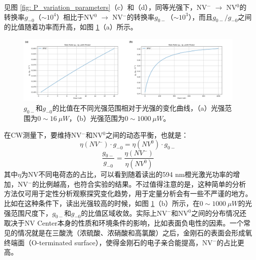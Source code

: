 \documentclass[type = bachelor]{whu-thesis}
\begin{document}
见图 \ref{fig: P_variation_parameters}（c）和（d），同等光强下，NV$^-$ $\rightarrow$ NV$^0$的转换率$g_{-0}$（$\sim 10^4$）相比于NV$^0$ $\rightarrow$ NV$^-$的转换率$g_{0-}$（$\sim 10^3$），而且$g_{0-}/g_{-0}$之间的比值随着功率而升高，如图 \ref{fig: g0_g1_ratio}（a）所示。
\begin{figure}
  \centering
  \includegraphics[width=1.0\textwidth]{figures/Chapter 5/g0_g1_ratio.png}
  \caption[$g_{0-}$和$g_{-0}$的比值在不同光强范围相对于光强的变化曲线]{$g_{0-}$和$g_{-0}$的比值在不同光强范围相对于光强的变化曲线，（a）光强范围为$0 \sim 16\ \mu W$，（b）光强范围为$0 \sim 1000\ \mu W$。}
  \label{fig: g0_g1_ratio}
\end{figure}
在CW测量下，要维持NV$^-$和NV$^0$之间的动态平衡，也就是：
\begin{equation}
  \eta(NV^-) \cdot g_{-0} = \eta(NV^0) \cdot g_{0-}
\end{equation}
\begin{equation}
  \frac{g_{0-}}{g_{-0}} = \frac{\eta(NV^-)}{\eta(NV^0)}
\end{equation}
其中$\eta$为NV不同电荷态的占比，可以看到随着读出的594 nm橙光激光功率的增加，NV$^-$的比例越高，也符合实验的结果。不过值得注意的是，这种简单的分析方法仅可用于定性分析观察探究变化趋势，用于定量分析会有一些不严谨的地方。比如在这种条件下，读出光强较高的时候，如图 \ref{fig: g0_g1_ratio}（b）所示，在$0 \sim 1000\ \mu W$的光强范围尺度下，$g_{0-}$和$g_{-0}$的比值区域收敛。实际上NV$^-$和NV$^0$之间的分布情况还取决于NV Center本身的性质和环境条件的影响，比如表面负电性的因素。一个常见的情况就是在三酸洗（浓硫酸、浓硝酸和高氯酸）之后，金刚石的表面会形成氧终端面（O-terminated surface），使得金刚石的电子亲合能提高，NV$^-$的占比更高。
\end{document}
